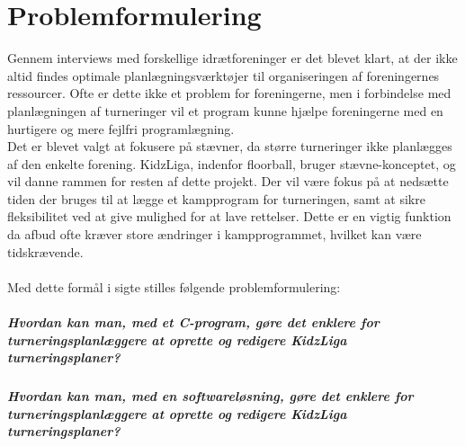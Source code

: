 \chapter{Problemformulering}\label{ch:chlabel}
Gennem interviews med forskellige idrætforeninger er det blevet klart, at der ikke altid findes optimale planlægningsværktøjer til organiseringen af foreningernes ressourcer. Ofte er dette ikke et problem for foreningerne, men i forbindelse med planlægningen af turneringer vil et program kunne hjælpe foreningerne med en hurtigere og mere fejlfri programlægning. \\
Det er blevet valgt at fokusere på stævner, da større turneringer ikke planlægges af den enkelte forening. KidzLiga, indenfor floorball, bruger stævne-konceptet, og vil danne rammen for resten af dette projekt. Der vil være fokus på at nedsætte tiden der bruges til at lægge et kampprogram for turneringen, samt at sikre fleksibilitet ved at give mulighed for at lave rettelser. Dette er en vigtig funktion da afbud ofte kræver store ændringer i kampprogrammet, hvilket kan være tidskrævende.
\\\\
Med dette formål i sigte stilles følgende problemformulering:
\paragraph{Hvordan kan man, med et C-program, gøre det enklere for turneringsplanlæggere at oprette og redigere KidzLiga turneringsplaner?}
\paragraph{Hvordan kan man, med en softwareløsning, gøre det enklere for turneringsplanlæggere at oprette og redigere KidzLiga turneringsplaner?}

